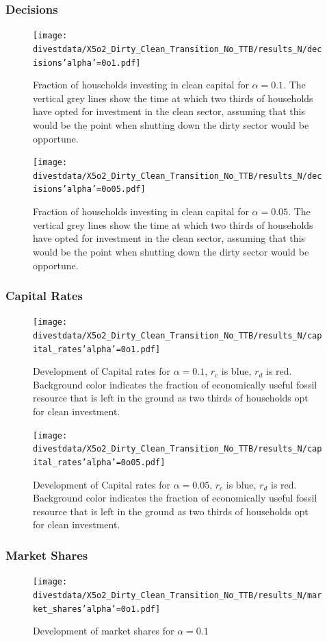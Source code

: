\subsubsection{Decisions}
\begin{figure}[H]
	\centering
	\texttt{[image: divestdata/X5o2\_Dirty\_Clean\_Transition\_No\_TTB/results\_N/decisions'alpha'=0o1.pdf]}
	\caption{Fraction of households investing in clean capital for $\alpha=0.1$. The vertical grey lines show the time at which two thirds of households have opted for investment in the clean sector, assuming that this would be the point when shutting down the dirty sector would be opportune. }
\end{figure}
\begin{figure}[H]
	\centering
	\texttt{[image: divestdata/X5o2\_Dirty\_Clean\_Transition\_No\_TTB/results\_N/decisions'alpha'=0o05.pdf]}
	\caption{Fraction of households investing in clean capital for $\alpha=0.05$. The vertical grey lines show the time at which two thirds of households have opted for investment in the clean sector, assuming that this would be the point when shutting down the dirty sector would be opportune. }

\end{figure}
\subsubsection{Capital Rates}
\begin{figure}[H]
	\centering
	\texttt{[image: divestdata/X5o2\_Dirty\_Clean\_Transition\_No\_TTB/results\_N/capital\_rates'alpha'=0o1.pdf]}
	\caption{Development of Capital rates for $\alpha=0.1$, $r_c$ is blue, $r_d$ is red. Background color indicates the fraction of economically useful fossil resource that is left in the ground as two thirds of households opt for clean investment.}
	\label{5o2_3}
\end{figure}

\begin{figure}[H]
	\centering
	\texttt{[image: divestdata/X5o2\_Dirty\_Clean\_Transition\_No\_TTB/results\_N/capital\_rates'alpha'=0o05.pdf]}
	\caption{Development of Capital rates for $\alpha=0.05$, $r_c$ is blue, $r_d$ is red. Background color indicates the fraction of economically useful fossil resource that is left in the ground as two thirds of households opt for clean investment.}
	\label{5o2_4}
\end{figure}
\subsubsection{Market Shares}
\begin{figure}[H]
	\centering
	\texttt{[image: divestdata/X5o2\_Dirty\_Clean\_Transition\_No\_TTB/results\_N/market\_shares'alpha'=0o1.pdf]}
	\caption{Development of market shares for $\alpha=0.1$}

\end{figure}

